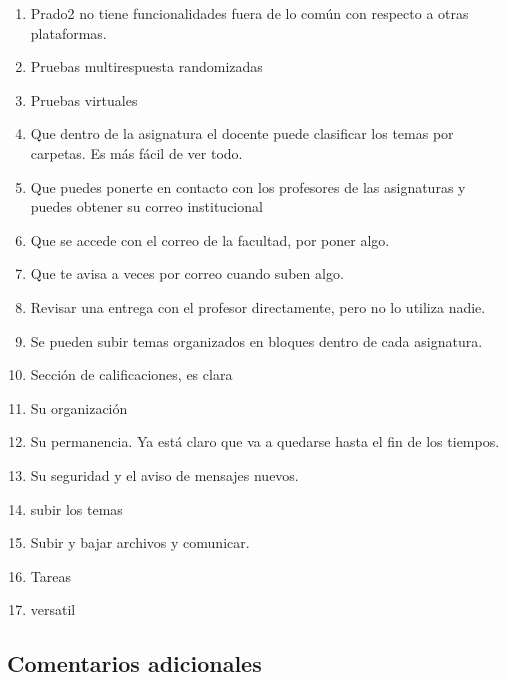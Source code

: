 \begin{enumerate}
\item Prado2 no tiene funcionalidades fuera de lo común con respecto a otras plataformas.
\item Pruebas multirespuesta randomizadas
\item Pruebas virtuales
\item Que dentro de la asignatura el docente puede clasificar los temas por carpetas. Es más fácil de ver todo.
\item Que puedes ponerte en contacto con los profesores de las asignaturas y puedes obtener su correo institucional
\item Que se accede con el correo de la facultad, por poner algo.
\item Que te avisa a veces por correo cuando suben algo.
\item Revisar una entrega con el profesor directamente, pero no lo utiliza nadie.
\item Se pueden subir temas organizados en bloques dentro de cada asignatura.
\item Sección de calificaciones, es clara
\item Su organización
\item Su permanencia. Ya está claro que va a quedarse hasta el fin de los tiempos.
\item Su seguridad y el aviso de mensajes nuevos.
\item subir los temas
\item Subir y bajar archivos y comunicar.
\item Tareas
\item versatil
\end{enumerate}

\subsection{Comentarios adicionales}

